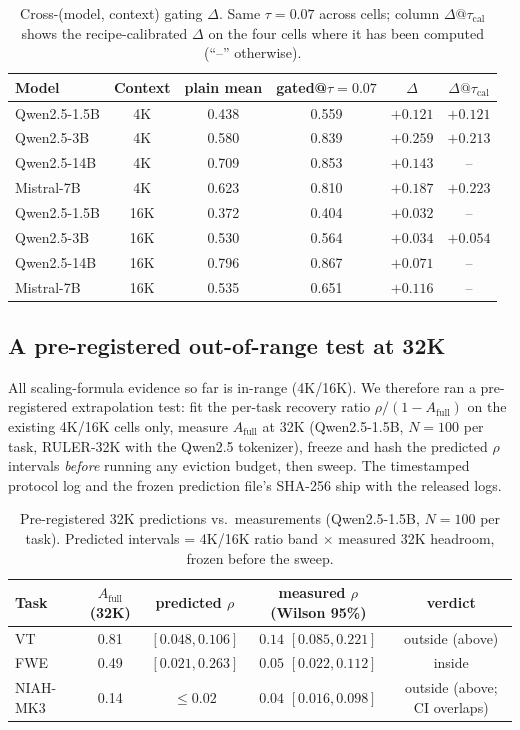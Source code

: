 \documentclass{article}
\begin{document}
\begin{table}[h]
\centering
\caption{Cross-(model, context) gating $\Delta$. Same $\tau = 0.07$
across cells; column $\Delta@\tau_{\mathrm{cal}}$ shows the recipe-calibrated
$\Delta$ on the four cells where it has been computed (``--'' otherwise).}
\label{tab:scaling}
\begin{tabular}{lccccc}
\toprule
Model & Context & plain mean & gated@$\tau\!=\!0.07$ & $\Delta$ &
$\Delta@\tau_{\mathrm{cal}}$ \\
\midrule
Qwen2.5-1.5B   & 4K  & 0.438 & 0.559 & $+0.121$ & $+0.121$ \\
Qwen2.5-3B     & 4K  & 0.580 & 0.839 & $+0.259$ & $+0.213$ \\
Qwen2.5-14B    & 4K  & 0.709 & 0.853 & $+0.143$ & --       \\
Mistral-7B      & 4K  & 0.623 & 0.810 & $+0.187$ & $+0.223$ \\
\midrule
Qwen2.5-1.5B   & 16K & 0.372 & 0.404 & $+0.032$ & --       \\
Qwen2.5-3B     & 16K & 0.530 & 0.564 & $+0.034$ & $+0.054$ \\
Qwen2.5-14B    & 16K & 0.796 & 0.867 & $+0.071$ & --       \\
Mistral-7B      & 16K & 0.535 & 0.651 & $+0.116$ & --       \\
\bottomrule
\end{tabular}
\end{table}

\subsection{A pre-registered out-of-range test at 32K}
\label{subsec:prereg32k}

All scaling-formula evidence so far is in-range (4K/16K). We therefore
ran a pre-registered extrapolation test: fit the per-task recovery
ratio $\rho / (1 - A_{\mathrm{full}})$ on the existing 4K/16K cells
only, measure $A_{\mathrm{full}}$ at 32K (Qwen2.5-1.5B, $N = 100$ per
task, RULER-32K with the Qwen2.5 tokenizer), freeze and hash the
predicted $\rho$ intervals \emph{before} running any eviction budget,
then sweep. The timestamped protocol log and the frozen prediction
file's SHA-256 ship with the released logs.

\begin{table}[h]
\centering
\caption{Pre-registered 32K predictions vs.\ measurements
(Qwen2.5-1.5B, $N = 100$ per task). Predicted intervals = 4K/16K ratio
band $\times$ measured 32K headroom, frozen before the sweep.}
\label{tab:prereg32k}
\begin{tabular}{lcccc}
\toprule
Task & $A_{\mathrm{full}}$(32K) & predicted $\rho$ & measured $\rho$ (Wilson 95\%) & verdict \\
\midrule
VT  & 0.81 & $[0.048, 0.106]$ & $0.14$ $[0.085, 0.221]$ & outside (above) \\
FWE & 0.49 & $[0.021, 0.263]$ & $0.05$ $[0.022, 0.112]$ & inside \\
NIAH-MK3 & 0.14 & $\le 0.02$ & $0.04$ $[0.016, 0.098]$ & outside (above; CI overlaps) \\
\bottomrule
\end{tabular}
\end{table}
\end{document}
